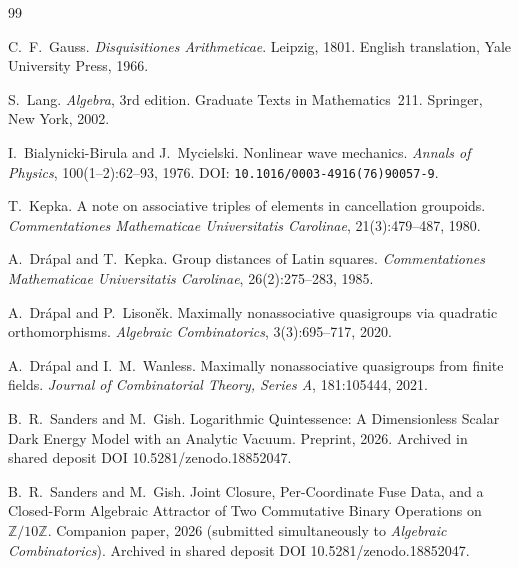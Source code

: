 \documentclass[11pt,reqno]{amsart}
\theoremstyle{plain}
\theoremstyle{definition}
\theoremstyle{remark}
\begin{document}
\begin{thebibliography}{99}

C.~F.~Gauss.
\newblock \emph{Disquisitiones Arithmeticae}.
\newblock Leipzig, 1801.
\newblock English translation, Yale University Press, 1966.

S.~Lang.
\newblock \emph{Algebra}, 3rd edition.
\newblock Graduate Texts in Mathematics~211. Springer, New York, 2002.

I.~Bialynicki-Birula and J.~Mycielski.
\newblock Nonlinear wave mechanics.
\newblock \emph{Annals of Physics}, 100(1--2):62--93, 1976.
\newblock DOI: \texttt{10.1016/0003-4916(76)90057-9}.

T.~Kepka.
\newblock A note on associative triples of elements in cancellation groupoids.
\newblock \emph{Commentationes Mathematicae Universitatis Carolinae},
21(3):479--487, 1980.

A.~Dr\'{a}pal and T.~Kepka.
\newblock Group distances of Latin squares.
\newblock \emph{Commentationes Mathematicae Universitatis Carolinae},
26(2):275--283, 1985.

A.~Dr\'{a}pal and P.~Lison\v{e}k.
\newblock Maximally nonassociative quasigroups via quadratic orthomorphisms.
\newblock \emph{Algebraic Combinatorics}, 3(3):695--717, 2020.

A.~Dr\'{a}pal and I.~M.~Wanless.
\newblock Maximally nonassociative quasigroups from finite fields.
\newblock \emph{Journal of Combinatorial Theory, Series A}, 181:105444, 2021.

B.~R.~Sanders and M.~Gish.
\newblock Logarithmic Quintessence: A Dimensionless Scalar Dark Energy
Model with an Analytic Vacuum.
\newblock Preprint, 2026.
\newblock Archived in shared deposit DOI 10.5281/zenodo.18852047.

B.~R.~Sanders and M.~Gish.
\newblock Joint Closure, Per-Coordinate Fuse Data, and a Closed-Form
Algebraic Attractor of Two Commutative Binary Operations on
$\mathbb{Z}/10\mathbb{Z}$.
\newblock Companion paper, 2026 (submitted simultaneously to
\emph{Algebraic Combinatorics}).
\newblock Archived in shared deposit DOI 10.5281/zenodo.18852047.

\end{thebibliography}
\end{document}
